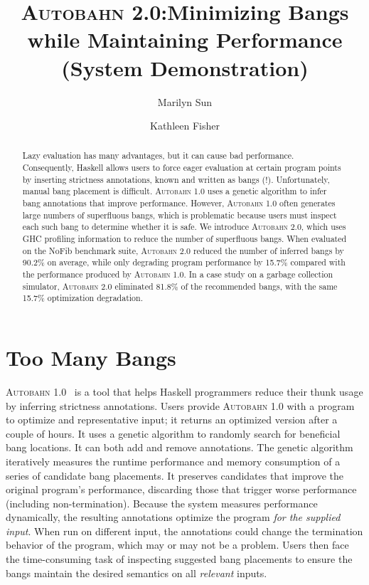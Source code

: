 \documentclass[sigplan,screen]{acmart}
\newcommand{\Ao}[0]{\textsc{Autobahn 1.0}}
\newcommand{\At}[0]{\textsc{Autobahn 2.0}}
\begin{document}
\title[\At{} (System Demonstration)]{\At:\break Minimizing Bangs while Maintaining Performance
  (System Demonstration)}
\author{Marilyn Sun}

\author{Kathleen Fisher}
\begin{abstract}

Lazy evaluation has many advantages, but it can cause bad
performance. Consequently, Haskell allows users to
force eager evaluation at certain program points by inserting
strictness annotations, known and written as bangs (!).
Unfortunately, manual bang placement
is difficult. \Ao{}
uses a genetic algorithm to infer bang annotations
that improve performance. However, \Ao{} often generates
large numbers of superfluous bangs,
which is problematic because users must inspect each such bang to
determine whether it is safe.
We introduce \At, which uses GHC
profiling information to reduce the number of superfluous bangs.
When evaluated on the NoFib benchmark suite, 
\At{} reduced the number of inferred bangs by 90.2\% on average,
while only degrading program performance by 15.7\% compared with the
performance produced by \Ao{}. 
In a case study on a garbage collection simulator, 
\At{} eliminated 81.8\% of the recommended bangs, with the 
same 15.7\% optimization degradation.
\end{abstract}
\maketitle

\section{Too Many Bangs}

\Ao~\cite{autobahn-wang} is a tool that helps Haskell programmers 
reduce their thunk usage by inferring strictness
annotations. Users provide \Ao{} with a
program to optimize and representative input; it returns
an optimized version after a couple of hours.
It uses a genetic algorithm to randomly search for
beneficial bang locations. It can 
both add and remove annotations.
The genetic
algorithm iteratively measures the runtime performance and memory
consumption of a series of 
candidate bang placements. It preserves candidates that improve the original
program's performance, discarding those that trigger worse performance
(including non-termination).
Because the system  measures performance dynamically, the resulting
annotations optimize the program 
\textit{for the supplied input}.  When run on different input, the
annotations could change the termination behavior of the program,
which may or may not be a problem.
Users then face the time-consuming task of inspecting suggested bang placements
to ensure the bangs maintain the desired semantics on all \textit{relevant}
inputs.  
\end{document}
